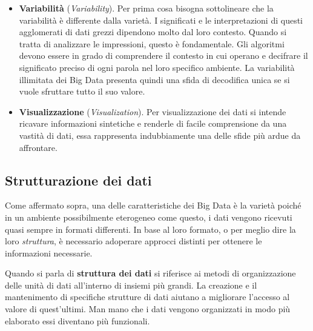 \begin{itemize}
    \item \textbf{Variabilità} (\textit{Variability}). Per prima cosa bisogna sottolineare che la variabilità è differente dalla varietà. I significati e le interpretazioni di questi agglomerati di dati grezzi dipendono molto dal loro contesto. Quando si tratta di analizzare le impressioni, questo è fondamentale. Gli algoritmi devono essere in grado di comprendere il contesto in cui operano e decifrare il significato preciso di ogni parola nel loro specifico ambiente. La variabilità illimitata dei Big Data presenta quindi una sfida di decodifica unica se si vuole sfruttare tutto il suo valore.
    \item \textbf{Visualizzazione} (\textit{Visualization}). Per visualizzazione dei dati si intende ricavare informazioni sintetiche e renderle di facile comprensione da una vastità di dati, essa rappresenta indubbiamente una delle sfide più ardue da affrontare.
\end{itemize}

\subsection{Strutturazione dei dati}

Come affermato sopra, una delle caratteristiche dei Big Data è la varietà poiché in un ambiente possibilmente eterogeneo come questo, i dati vengono ricevuti quasi sempre in formati differenti. In base al loro formato, o per meglio dire la loro \textit{struttura}, è necessario adoperare approcci distinti per ottenere le informazioni necessarie.

Quando si parla di \textbf{struttura dei dati} si riferisce ai metodi di organizzazione delle unità di dati all'interno di insiemi più grandi. La creazione e il mantenimento di specifiche strutture di dati aiutano a migliorare l'accesso al valore di quest'ultimi. Man mano che i dati vengono organizzati in modo più elaborato essi diventano più funzionali.\cite{theastrologypage_data_structure}

